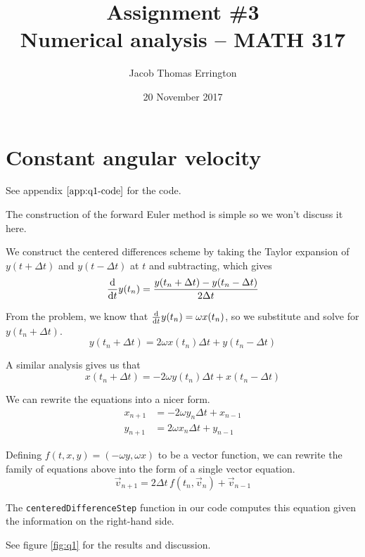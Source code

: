\documentclass[11pt,letterpaper]{article}
\author{Jacob Thomas Errington}
\title{Assignment \#3\\Numerical analysis -- MATH 317}
\date{20 November 2017}
\begin{document}
\maketitle

\section{Constant angular velocity}

See appendix $\ref{app:q1-code}$ for the code.

The construction of the forward Euler method is simple so we won't discuss it
here.

We construct the centered differences scheme by taking the Taylor expansion of
$y(t + \Delta t)$ and $y(t - \Delta t)$ at $t$ and subtracting, which gives
%
\begin{equation*}
  \frac{\mathrm{d} }{\mathrm{d} t} y(t_n) = \frac{y(t_n + \Delta t) - y(t_n - \Delta t)}{2 \Delta t}
\end{equation*}

From the problem, we know that $\frac{\mathrm{d} }{\mathrm{d} t} y(t_n) = \omega x(t_n)$,
so we substitute and solve for $y(t_n + \Delta t)$.
%
\begin{equation*}
  y(t_n + \Delta t) = 2 \omega x(t_n) \Delta t + y(t_n - \Delta t)
\end{equation*}

A similar analysis gives us that
%
\begin{equation*}
  x(t_n + \Delta t) = -2 \omega y(t_n) \Delta t + x(t_n - \Delta t)
\end{equation*}

We can rewrite the equations into a nicer form.
%
\begin{align*}
  x_{n+1} &= - 2 \omega y_n \Delta t + x_{n-1} \\
  y_{n+1} &= 2 \omega x_n \Delta t + y_{n-1}
\end{align*}

Defining $f(t, x, y) = (-\omega y, \omega x)$ to be a vector function, we can
rewrite the family of equations above into the form of a single vector
equation.
%
\begin{equation*}
  \vec v_{n+1} = 2 \Delta t\, f(t_n, \vec v_n) + \vec v_{n-1}
\end{equation*}

The \texttt{centeredDifferenceStep} function in our code computes this equation
given the information on the right-hand side.

See figure \ref{fig:q1} for the results and discussion.
\end{document}

